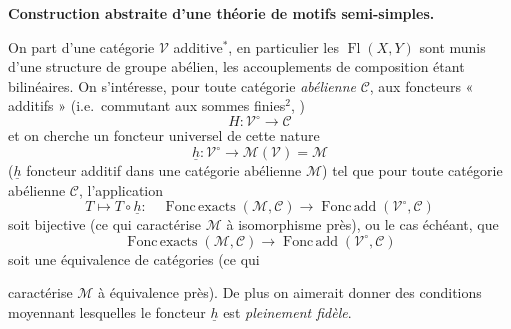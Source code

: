 \documentclass[11pt,a4paper]{article}
\begin{document}
\textbf{Construction abstraite d'une théorie de motifs semi-simples.}

On part d'une catégorie $\mathcal{V}$ \struck{\ill{}} additive${}^{*}$, en
particulier \struck{\ill{}} les \struck{\ill{}} $\operatorname{Fl}(X,Y)$ sont
munis d'une structure de groupe abélien, les accouplements de composition
étant bilinéaires.
On s'intéresse, pour toute catégorie \emph{abélienne} $\mathcal{C}$, aux
foncteurs \struck{\ill{}} « additifs » (i.e.\ commutant aux sommes finies${}^{2}$,
 )
\[
  H \colon \mathcal{V}^{\circ} \longrightarrow \mathcal{C}
\]
et on cherche un foncteur universel de cette nature
\[
  \underline{h} \colon \mathcal{V}^{\circ} \longrightarrow
  \mathcal{M}(\mathcal{V}) = \mathcal{M}
\]
($\underline{h}$ foncteur additif dans une catégorie abélienne $\mathcal{M}$) tel
que pour toute catégorie abélienne $\mathcal{C}$, l'application
\[
  T \longmapsto T \circ \underline{h} \colon\quad
  \operatorname{Fonc\,exacts}(\mathcal{M}, \mathcal{C}) \longrightarrow
  \operatorname{Fonc\,add}(\mathcal{V}^{\circ}, \mathcal{C})
\]
soit bijective (ce qui caractérise $\mathcal{M}$ à 
isomorphisme près), ou le cas échéant, que
\[
  \operatorname{Fonc\,exacts}(\mathcal{M}, \mathcal{C}) \longrightarrow
  \operatorname{Fonc\,add}(\mathcal{V}^{\circ}, \mathcal{C})
\]
soit une équivalence de catégories (ce qui

caractérise $\mathcal{M}$ à équivalence près). De plus on aimerait donner des
conditions moyennant lesquelles le foncteur $\underline{h}$ est
\emph{pleinement fidèle}.
\end{document}
